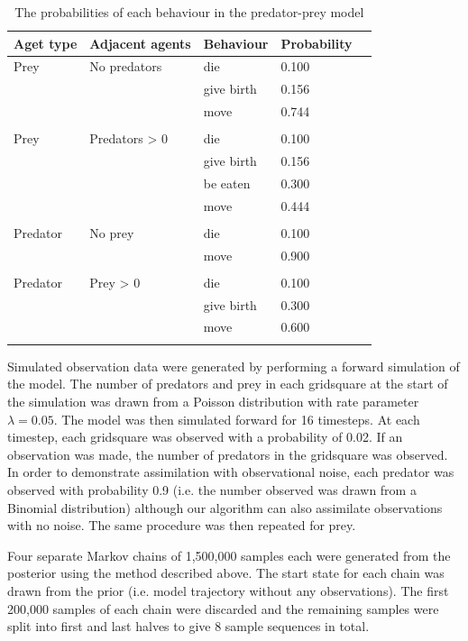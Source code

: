 \documentclass{article}
\begin{document}
\begin{table}[ht]
	\begin{center}
		\begin{tabular}{llllc}
		\hline
		Aget type & Adjacent agents & Behaviour & Probability\\
		\hline
		Prey & No predators & die &        0.100\\
			& & give birth &        0.156\\
			& & move &        0.744\\
			& &&\\
		Prey & Predators > 0 & die &        0.100\\
			& & give birth &        0.156\\
			& & be eaten &        0.300\\
			& & move &        0.444\\
			& &&\\
		Predator  & No prey & die  &      0.100\\
			& & move &        0.900\\
			& &&\\
		Predator  & Prey > 0 & die  &      0.100\\
			& & give birth &        0.300\\
			& & move &        0.600\\
		\hline& 
		\end{tabular}
	\end{center}
	\caption{The probabilities of each behaviour in the predator-prey model}
	\label{rates}
\end{table}






Simulated observation data were generated by performing a forward simulation of the model. The number of predators and prey in each gridsquare at the start of the simulation was drawn from a Poisson distribution with rate parameter $\lambda = 0.05$. The model was then simulated forward for 16 timesteps. At each timestep, each gridsquare was observed with a probability of 0.02. If an observation was made, the number of predators in the gridsquare was observed. In order to demonstrate assimilation with observational noise, each predator was observed with probability 0.9 (i.e. the number observed was drawn from a Binomial distribution) although our algorithm can also assimilate observations with no noise. The same procedure was then repeated for prey.

Four separate Markov chains of 1,500,000 samples each were generated from the posterior using the method described above. The start state for each chain was drawn from the prior (i.e. model trajectory without any observations). The first 200,000 samples of each chain were discarded and the remaining samples were split into first and last halves to give 8 sample sequences in total. 
\end{document}
